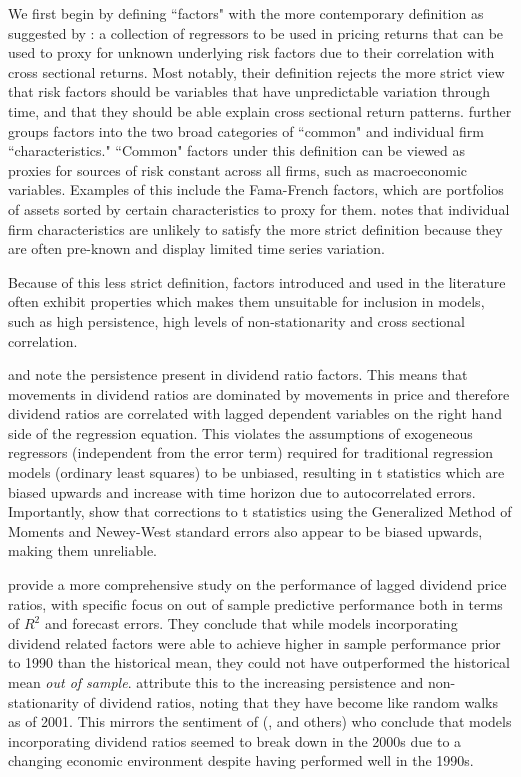 \documentclass[a4paper, table]{article}
\begin{document}
We first begin by defining ``factors" with the more contemporary definition as suggested by \cite{harvey__2016}: a collection of regressors to be used in pricing returns that can be used to proxy for unknown underlying risk factors due to their correlation with cross sectional returns. Most notably, their definition rejects the more strict view that risk factors should be variables that have unpredictable variation through time, and that they should be able explain cross sectional return patterns. \cite{harvey__2016} further groups factors into the two broad categories of ``common" and individual firm ``characteristics." ``Common" factors under this definition can be viewed as proxies for sources of risk constant across all firms, such as macroeconomic variables. Examples of this include the Fama-French factors, which are portfolios of assets sorted by certain characteristics to proxy for them. \cite{harvey__2016} notes that individual firm characteristics are unlikely to satisfy the more strict definition because they are often pre-known and display limited time series variation.

Because of this less strict definition, factors introduced and used in the literature often exhibit properties which makes them unsuitable for inclusion in models, such as high persistence, high levels of non-stationarity and cross sectional correlation. 

\cite{goetzmann_testing_1993} and \cite{ang_stock_2006} note the persistence present in dividend ratio factors. This means that movements in dividend ratios are dominated by movements in price and therefore dividend ratios are correlated with lagged dependent variables on the right hand side of the regression equation. This violates the assumptions of exogeneous regressors (independent from the error term) required for traditional regression models (ordinary least squares) to be unbiased, resulting in t statistics which are biased upwards and increase with time horizon due to autocorrelated errors. Importantly, \cite{goetzmann_testing_1993} show that corrections to t statistics using the Generalized Method of Moments and Newey-West standard errors also appear to be biased upwards, making them unreliable. 

\cite{goyal_predicting_2003} provide a more comprehensive study on the performance of lagged dividend price ratios, with specific focus on out of sample predictive performance both in terms of $R^2$ and forecast errors. They conclude that while models incorporating dividend related factors were able to achieve higher in sample performance prior to 1990 than the historical mean, they could not have outperformed the historical mean \textit{out of sample}. \cite{goyal_predicting_2003} attribute this to the increasing persistence and non-stationarity of dividend ratios, noting that they have become like random walks as of 2001. This mirrors the sentiment of (\cite{lettau_consumption_2001}, \cite{schwert_anomalies_2003} and others) who conclude that models incorporating dividend ratios seemed to break down in the 2000s due to a changing economic environment despite having performed well in the 1990s.
\end{document}
